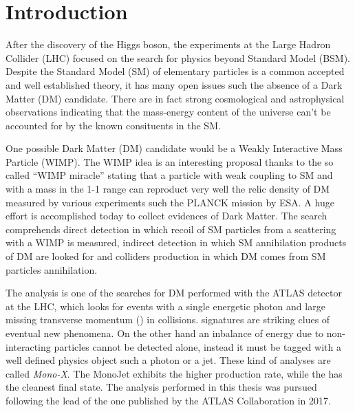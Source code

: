 \chapter{Introduction}
\lettrine{A}{}fter the discovery of the Higgs boson, the experiments at the Large Hadron Collider (LHC) focused on the search for physics beyond Standard Model (BSM). Despite the Standard Model (SM) of elementary particles is a common accepted and well established theory, it has many open issues such the absence of a Dark Matter (DM) candidate. There are in fact strong cosmological and astrophysical observations indicating that the mass-energy content of the universe can't be accounted for by the known consituents in the SM.
  
One possible Dark Matter (DM) candidate would be a Weakly Interactive Mass Particle (WIMP). The WIMP idea is an interesting proposal thanks to the so called ``WIMP miracle'' stating that a particle with weak coupling to SM and with a mass in the \SI{1}{\gev}-\SI{1}{\tev} range can reproduct very well the relic density of DM measured by various experiments such the PLANCK mission by ESA. A huge effort is accomplished today to collect evidences of Dark Matter. The search comprehends direct detection in which recoil of SM particles from a scattering with a WIMP is measured, indirect detection in which SM annihilation products of DM are looked for and colliders production in which DM comes from SM particles annihilation.

The \mph analysis is one of the searches for DM performed with the ATLAS detector at the LHC, which looks for events with a single energetic photon and large missing transverse momentum (\met) in \pp collisions. \met signatures are striking clues of eventual new phenomena. On the other hand an inbalance of energy due to non-interacting particles cannot be detected alone, instead it must be tagged with a well defined physics object such a photon or a jet. These kind of analyses are called \emph{Mono-X}. The MonoJet exhibits the higher production rate, while the \mph has the cleanest final state. The analysis performed in this thesis was pursued following the lead of the one published by the ATLAS Collaboration in 2017.

